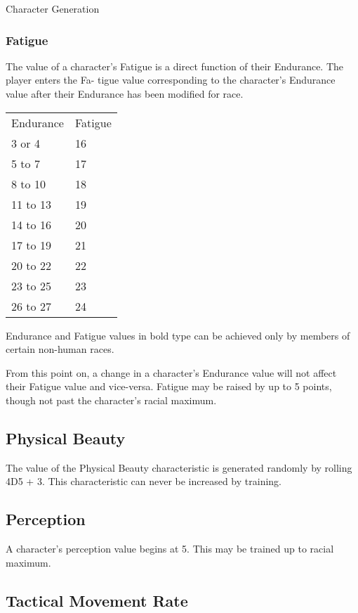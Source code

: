 \begin{Chapter}{Character Generation}
\subsubsection{Fatigue}

The value of a character’s Fatigue is a direct function of their
Endurance.  The player enters the Fa- tigue value corresponding to the
character’s Endurance value after their Endurance has been modified
for race.

\begin{tabularx}{\columnwidth}{XX}
Endurance	& Fatigue \\
3 or 4		& 16 \\
5 to 7		& 17 \\
8 to 10		& 18 \\
11 to 13	& 19 \\
14 to 16	& 20 \\
17 to 19	& 21 \\
20 to 22	& 22 \\
23 to 25	& 23 \\
26 to 27	& 24 \\
\end{tabularx}

Endurance and Fatigue values in bold type can be achieved only by
members of certain non-human races.

From this point on, a change in a character’s Endurance value will not
affect their Fatigue value and vice-versa.  Fatigue may be raised by
up to 5 points, though not past the character’s racial maximum.

\subsection{Physical Beauty}

The value of the Physical Beauty characteristic is generated randomly
by rolling 4D5 + 3. This characteristic can never be increased by
training.

\subsection{Perception}

A character’s perception value begins at 5.  This may be trained up to
racial maximum.

\subsection{Tactical Movement Rate}


\end{Chapter}

